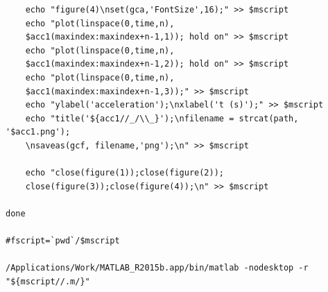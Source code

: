 \documentclass{sigchi}
\begin{document}
\begin{lstlisting}
	echo "figure(4)\nset(gca,'FontSize',16);" >> $mscript
	echo "plot(linspace(0,time,n),
    $acc1(maxindex:maxindex+n-1,1)); hold on" >> $mscript
	echo "plot(linspace(0,time,n),
    $acc1(maxindex:maxindex+n-1,2)); hold on" >> $mscript
	echo "plot(linspace(0,time,n),
    $acc1(maxindex:maxindex+n-1,3));" >> $mscript
	echo "ylabel('acceleration');\nxlabel('t (s)');" >> $mscript
	echo "title('${acc1//_/\\_}');\nfilename = strcat(path, '$acc1.png');
    \nsaveas(gcf, filename,'png');\n" >> $mscript

	echo "close(figure(1));close(figure(2));
    close(figure(3));close(figure(4));\n" >> $mscript

done

#fscript=`pwd`/$mscript

/Applications/Work/MATLAB_R2015b.app/bin/matlab -nodesktop -r "${mscript//.m/}"
\end{lstlisting}
\end{document}
